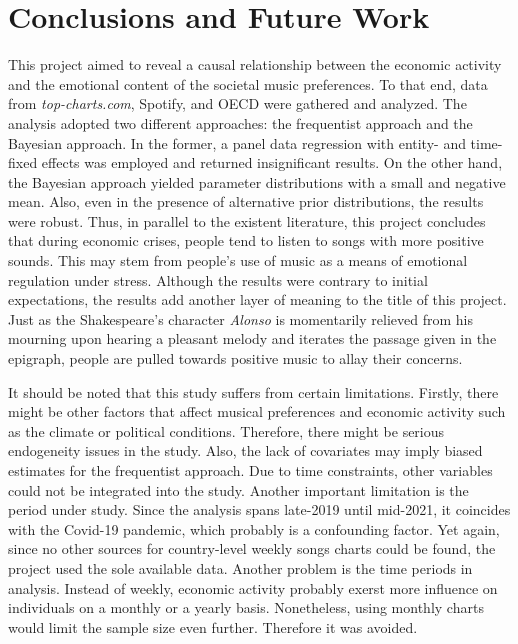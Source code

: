 \documentclass[12pt]{article}
\begin{document}
\section{Conclusions and Future Work}

This project aimed to reveal a causal relationship between the economic activity and the emotional content of the societal music preferences. To that end, data from \textit{top-charts.com}, Spotify, and OECD were gathered and analyzed. The analysis adopted two different approaches: the frequentist approach and the Bayesian approach. In the former, a panel data regression with entity- and time-fixed effects was employed and returned insignificant results. On the other hand, the Bayesian approach yielded parameter distributions with a small and negative mean. Also, even in the presence of alternative prior distributions, the results were robust. Thus, in parallel to the existent literature, this project concludes that during economic crises, people tend to listen to songs with more positive sounds. This may stem from people's use of music as a means of emotional regulation under stress. Although the results were contrary to initial expectations, the results add another layer of meaning to the title of this project. Just as the Shakespeare's character \textit{Alonso} is momentarily relieved from his mourning upon hearing a pleasant melody and iterates the passage given in the epigraph, people are pulled towards positive music to allay their concerns.

It should be noted that this study suffers from certain limitations. Firstly, there might be other factors that affect musical preferences and economic activity such as the climate or political conditions. Therefore, there might be serious endogeneity issues in the study. Also, the lack of covariates may imply biased estimates for the frequentist approach. Due to time constraints, other variables could not be integrated into the study. Another important limitation is the period under study. Since the analysis spans late-2019 until mid-2021, it coincides with the Covid-19 pandemic, which probably is a confounding factor. Yet again, since no other sources for country-level weekly songs charts could be found, the project used the sole available data. Another problem is the time periods in analysis. Instead of weekly, economic activity probably exerst more influence on individuals on a monthly or a yearly basis. Nonetheless, using monthly charts would limit the sample size even further. Therefore it was avoided.
\end{document}
